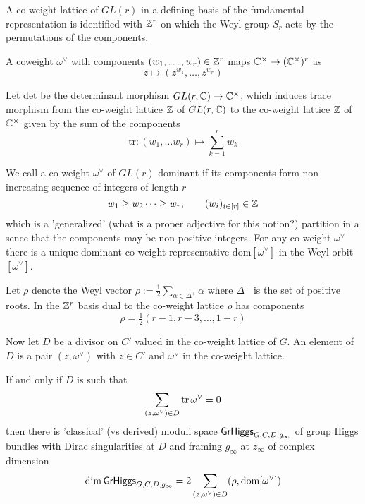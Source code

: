 \documentclass[12pt,psamsfonts,reqno]{amsart}
\begin{document}
A co-weight lattice of $GL(r)$ in a defining basis of the fundamental representation
is identified with $\mathbb Z^{r}$ on which the Weyl group $S_r$ acts by the permutations of the components. 


A coweight $\omega^{\vee}$ with components $(w_1, \dots, w_r) \in \mathbb Z^{r}$ maps $\mathbb C^{\times} \to (\mathbb C^{\times})^{r}$ as
\begin{equation}
  z \mapsto (z^{w_1}, \dots, z^{w_r})
\end{equation}

Let $\mathrm{det}$ be the determinant morphism $GL(r,\mathbb C) \to \mathbb C^{\times}$, which induces
trace morphism from the co-weight lattice $\mathbb Z$ of $GL(r,\mathbb C)$ to the co-weight lattice $\mathbb Z$ of $\mathbb C^{\times}$ given by the sum
of the components 
\begin{equation}
\mathrm{tr}:   (w_1, \dots w_r) \mapsto \sum_{k=1}^{r} w_k 
\end{equation}

We call a co-weight $\omega^{\vee}$ of $GL(r)$ dominant if its components form non-increasing sequence of integers of length $r$
\begin{equation}
  w_1 \geq w_2 \dots \geq w_r, \qquad (w_i)_{i \in [r]} \in \mathbb Z
\end{equation}
which is a 'generalized' (what is a proper adjective for this notion?) partition in a sence that the components may be non-positive integers. For any co-weight $\omega^{\vee}$ there is a unique dominant co-weight representative $\mathrm{dom} [\omega^{\vee}]$
in the Weyl orbit $[\omega^{\vee}]$.

Let $\rho$ denote the Weyl vector $\rho := \frac{1}{2} \sum_{\alpha \in \Delta^{+}} \alpha $ where $\Delta^{+}$ is
the set of positive roots. In the $\mathbb Z^{r}$ basis dual to the co-weight lattice $\rho$ has components
\begin{equation}
  \rho = \tfrac{1}{2} ( r - 1, r - 3, \dots, 1-r)
\end{equation}


Now let $D$ be a divisor on $C'$ valued in the co-weight lattice of $G$. An element of $D$ is a pair $(z, \omega^\vee)$
with $z \in C'$ and $\omega^{\vee}$ in the co-weight lattice.
\begin{lemma}
  If and only if $D$ is such that 
  \begin{equation}
    \sum_{(z,\omega^{\vee}) \in D} \operatorname{tr} \omega^{\vee} = 0
  \end{equation}
  then there is 'classical' (vs derived) moduli space $\mathsf{GrHiggs}_{G,C,D,g_\infty}$
  of group Higgs bundles with Dirac singularities at $D$ and framing $g_\infty$ at $z_\infty$ of complex dimension
  \begin{equation}
\label{eq:dim}
    \dim \mathsf{GrHiggs}_{G,C,D,g_\infty} =   2  \sum_{(z,\omega^{\vee}) \in D} ( \rho, \mathrm{dom}[\omega^{\vee}])
  \end{equation}
\end{lemma}
\end{document}
